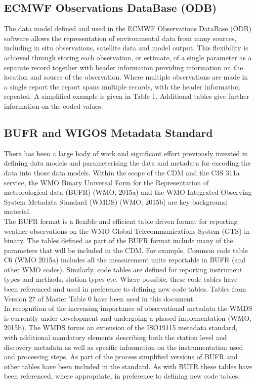 \documentclass[a4paper]{article}
\begin{document}
\subsection{ECMWF Observations DataBase (ODB)}

The data model defined and used in the ECMWF Observations DataBase (ODB) software allows the representation of environmental data from many sources, including in situ observations, satellite data and model output. This flexibility is achieved through storing each observation, or estimate, of a single parameter as a separate record together with header information providing information on the location and source of the observation. Where multiple observations are made in a single report the report spans multiple records, with the header information repeated. A simplified example is given in Table 1. Additional tables give further information on the coded values.\\



\subsection {BUFR and WIGOS Metadata Standard}
There has been a large body of work and significant effort previously invested in defining data models and parameterising the data and metadata for encoding the data into those data models.  Within the scope of the CDM and the C3S 311a service, the WMO Binary Universal Form for the Representation of meteorological data (BUFR) (WMO, 2015a) and the WMO Integrated Observing System Metadata Standard (WMDS) (WMO, 2015b) are key background material. \\

The BUFR format is a flexible and efficient table driven format for reporting weather observations on the WMO Global Telecommunications System (GTS) in binary. The tables defined as part of the BUFR format include many of the parameters that will be included in the CDM. For example, Common code table C6 (WMO 2015a) includes all the measurement units reportable in BUFR (and other WMO codes). Similarly, code tables are defined for reporting instrument types and methods, station types etc. Where possible, these code tables have been referenced and used in preference to defining new code tables.  Tables from Version 27 of Master Table 0 have been used in this document.\\

In recognition of the increasing importance of observational metadata the WMDS is currently under development and undergoing a phased implementation (WMO, 2015b). The WMDS forms an extension of the ISO19115 metadata standard, with additional mandatory elements describing both the station level and discovery metadata as well as specific information on the instrumentation used and processing steps. As part of the process simplified versions of BUFR and other tables have been included in the standard. As with BUFR these tables have been referenced, where appropriate, in preference to defining new code tables.\\
\end{document}
